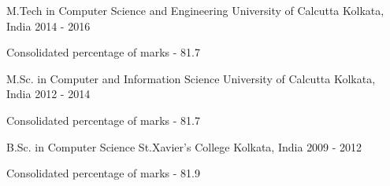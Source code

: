 

\begin{cventries}

  \cventry
    {M.Tech in Computer Science and Engineering} %
    {University of Calcutta} %
    {Kolkata, India} %
    {2014 - 2016} %
    {
      \begin{cvitems} %
        \item {Consolidated percentage of marks - 81.7}
      \end{cvitems}
    }


  \cventry
    {M.Sc. in Computer and Information Science} %
    {University of Calcutta} %
    {Kolkata, India} %
    {2012 - 2014} %
    {
      \begin{cvitems} %
        \item {Consolidated percentage of marks - 81.7}
      \end{cvitems}
    }


  \cventry
    {B.Sc. in Computer Science} %
    {St.Xavier's College} %
    {Kolkata, India} %
    {2009 - 2012} %
    {
      \begin{cvitems} %
        \item {Consolidated percentage of marks - 81.9}
      \end{cvitems}
    }


\end{cventries}
